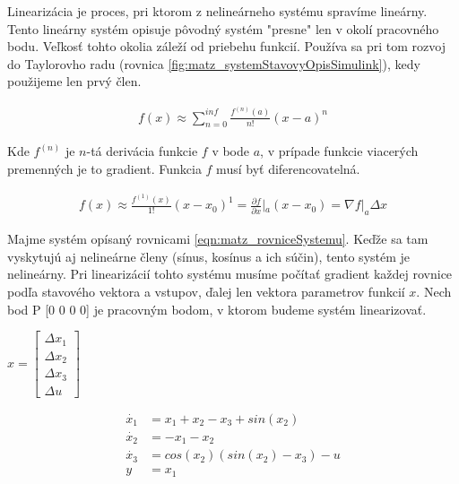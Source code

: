 \documentclass[../main.tex]{subfiles}
\begin{document}
Linearizácia je proces, pri ktorom z nelineárneho systému spravíme lineárny. Tento lineárny systém opisuje pôvodný systém "presne" len v okolí pracovného bodu. Veľkosť tohto okolia záleží od priebehu funkcií. Používa sa pri tom rozvoj do Taylorovho radu (rovnica \ref{fig:matz_systemStavovyOpisSimulink}), kedy použijeme len prvý člen.

\begin{equation}
	\begin{split}
		f(x) \approx \sum^{inf}_{n=0}{\frac{f^{(n)}(a)}{n!}(x-a)^n}
	\end{split}
	\label{eqn:matz_taylorovRad}
\end{equation}

Kde $f^{(n)}$ je $n$-tá derivácia funkcie $f$ v bode $a$, v prípade funkcie viacerých premenných je to gradient. Funkcia $f$ musí byť diferencovatelná.

\begin{equation}
	\begin{split}
		f(x) \approx \frac{f^{(1)}(x)}{1!}(x-x_0)^1 = \frac{\partial{f}}{\partial{x}}|_{a}(x-x_0) = \nabla{f}|_{a}\Delta{x}
	\end{split}
	\label{eqn:matz_prvyClenTaylorovhoRadu}
\end{equation}

Majme systém opísaný rovnicami \ref{eqn:matz_rovniceSystemu}. Keďže sa tam vyskytujú aj nelineárne členy (sínus, kosínus a ich súčin), tento systém je nelineárny. Pri linearizácií tohto systému musíme počítať gradient každej rovnice podľa stavového vektora a vstupov, ďalej len vektora parametrov funkcií $x$. Nech bod P [0 0 0 0] je pracovným bodom, v ktorom budeme systém linearizovať.
\begin{center}
$x = \begin{bmatrix}
\Delta{x_1} \\
\Delta{x_2} \\
\Delta{x_3} \\
\Delta{u}
\end{bmatrix}$
\end{center}

\begin{equation}
		\begin{aligned}
		\dot{x_1} &= x_1 + x_2 - x_3 + sin(x_2) 			\\
		\dot{x_2} &= - x_1 - x_2 						\\
		\dot{x_3} &= cos(x_2) (sin(x_2) - x_3) - u 	\\
		y &= x_1
		\end{aligned}
		\label{eqn:matz_rovniceSystemu}
\end{equation}
\end{document}
